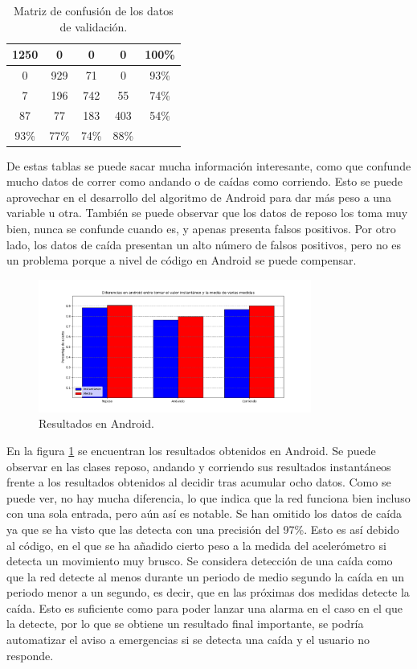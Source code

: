 \documentclass[12pt]{book}
\numberwithin{equation}{section}
\begin{document}
\begin{table}[h]
\centering
  \begin{tabular} {| c | c | c | c | c |}
  \hline
  \cellcolor{green!25}1250 & 0 & 0 & 0 & 100\% \\
  \hline
  0 & \cellcolor{green!25}929 & 71 & 0 & 93\% \\
  \hline
  7 & 196 & \cellcolor{green!25}742 & 55 & 74\% \\
  \hline
  87 & 77 & 183 & \cellcolor{green!25}403 & 54\% \\
  \hline
  93\% & 77\% & 74\% & 88\% & \\
  \hline
  \end{tabular}
    \caption{Matriz de confusión de los datos de validación.}
  \label{confusionValidation}
\end{table}


De estas tablas se puede sacar mucha información interesante, como que confunde mucho datos de correr como andando o de caídas como corriendo. Esto se puede aprovechar en el desarrollo del algoritmo de Android para dar más peso a una variable u otra. También se puede observar que los datos de reposo los toma muy bien, nunca se confunde cuando es, y apenas presenta falsos positivos. Por otro lado, los datos de caída presentan un alto número de falsos positivos, pero no es un problema porque a nivel de código en Android se puede compensar.


\begin{figure}[h]
    \centering
    \includegraphics[width=0.8\textwidth]{finalesAndroid.png}
    \caption{Resultados en Android.}
    \label{fig:finalesAndroid}
\end{figure}

En la figura \ref{fig:finalesAndroid} se encuentran los resultados obtenidos en Android. Se puede observar en las clases reposo, andando y corriendo sus resultados instantáneos frente a los resultados obtenidos al decidir tras acumular ocho datos. Como se puede ver, no hay mucha diferencia, lo que indica que la red funciona bien incluso con una sola entrada, pero aún así es notable. Se han omitido los datos de caída ya que se ha visto que las detecta con una precisión del 97\%. Esto es así debido al código, en el que se ha añadido cierto peso a la medida del acelerómetro si detecta un movimiento muy brusco. Se considera detección de una caída como que la red detecte al menos durante un periodo de medio segundo la caída en un periodo menor a un segundo, es decir, que en las próximas dos medidas detecte la caída. Esto es suficiente como para poder lanzar una alarma en el caso en el que la detecte, por lo que se obtiene un resultado final importante, se podría automatizar el aviso a emergencias si se detecta una caída y el usuario no responde.
\end{document}
